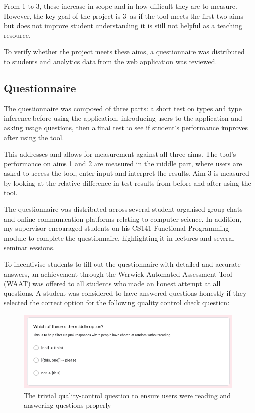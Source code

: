 \documentclass[a4paper,fleqn,12pt]{article}
\begin{document}
From 1 to 3, these increase in scope and in how difficult they are to measure. However, the key goal of the project is 3, as if the tool meets the first two aims but does not improve student understanding it is still not helpful as a teaching resource.

To verify whether the project meets these aims, a questionnaire was distributed to students and analytics data from the web application was reviewed.
\subsection{Questionnaire}\label{id:h.yqiowsgjmohq}
The questionnaire was composed of three parts: a short test on types and type inference before using the application, introducing users to the application and asking usage questions, then a final test to see if student’s performance improves after using the tool.

This addresses and allows for measurement against all three aims. The tool’s performance on aims 1 and 2 are measured in the middle part, where users are asked to access the tool, enter input and interpret the results. Aim 3 is measured by looking at the relative difference in test results from before and after using the tool.

The questionnaire was distributed across several student-organised group chats and online communication platforms relating to computer science. In addition, my supervisor encouraged students on his CS141 Functional Programming module to complete the questionnaire, highlighting it in lectures and several seminar sessions.

To incentivise students to fill out the questionnaire with detailed and accurate answers, an achievement through the Warwick Automated Assessment Tool (WAAT) was offered to all students who made an honest attempt at all questions. A student was considered to have answered questions honestly if they selected the correct option for the following quality control check question:

{\centering \begin{figure}[h!]
  \centering
  \includegraphics[width=0.882\linewidth]{images/image31.png}
  \caption{The trivial quality-control question to ensure users were reading and answering questions properly}
\end{figure} \par}
\end{document}
